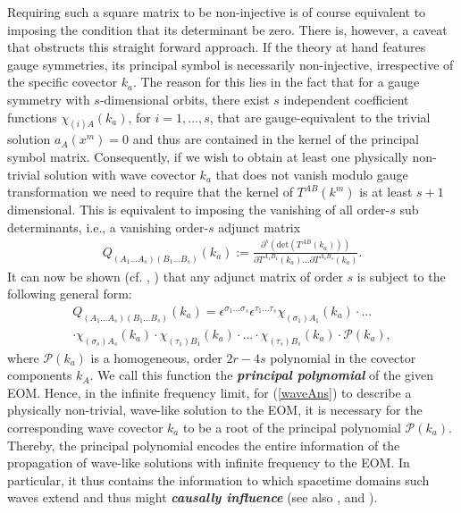 \documentclass[%
 reprint,
nofootinbib,
 amsmath,amssymb,
 aps,
 prd,
floatfix,
]{revtex4-2}
\begin{document}
Requiring such a square matrix to be non-injective is of course equivalent to imposing the condition that its determinant be zero. There is, however, a caveat that obstructs this straight forward approach. If the theory at hand features gauge symmetries, its principal symbol is necessarily non-injective, irrespective of the specific covector $k_a$. 
The reason for this lies in the fact that for a gauge symmetry with $s$-dimensional orbits, there exist $s$ independent coefficient functions $\chi_{(i)A}(k_a)$, for $i = 1,...,s$, that are gauge-equivalent to the trivial solution $a_A(x^m)=0$ and thus are contained in the kernel of the principal symbol matrix. 
Consequently, if we wish to obtain at least one physically non-trivial solution with wave covector $k_a$ that does not vanish modulo gauge transformation we need to require that the kernel of $T^{AB}(k^m)$ is at least $s+1$ dimensional. This is equivalent to imposing the vanishing of all order-$s$ sub determinants, i.e., a vanishing order-$s$ adjunct matrix
\begin{align}
    Q_{(A_1...A_s) (B_1...B_s)}(k_a) := \frac{\partial^s (\mathrm{det}(T^{AB}(k_a)))}{\partial T^{A_1 B_1}(k_a) ... \partial T^{A_s B_s}(k_a)}.
\end{align}  
It can now be shown (cf. \cite{2018PhRvD..97h4036D}, \cite{2009JPhA...42U5402I}) that any adjunct matrix of order $s$ is subject to the following general form:
\begin{multline}
    Q_{(A_1...A_s) (B_1...B_s)}(k_a) = \epsilon^{\sigma_1...\sigma_s} \epsilon^{\tau_1...\tau_s} \chi_{(\sigma_1)A_1}(k_a) \cdot ... \\
    \cdot \chi_{(\sigma_s)A_s}(k_a) \cdot \chi_{(\tau_1)B_1}(k_a) \cdot ... \cdot \chi_{(\tau_s)B_s}(k_a) \cdot \mathcal{P}(k_a),
\end{multline}
where $\mathcal{P}(k_a)$ is a homogeneous, order $2r-4s$ polynomial in the covector components $k_A$. We call this function the \textit{\textbf{principal polynomial}} of the given EOM.
Hence, in the infinite frequency limit, for (\ref{waveAns}) to describe a physically non-trivial, wave-like solution to the EOM, it is necessary for the corresponding wave covector $k_a$ to be a root of the principal polynomial $\mathcal{P}(k_a)$. 
Thereby, the principal polynomial encodes the entire information of the propagation of wave-like solutions with infinite frequency to the EOM. In particular, it thus contains the information to which spacetime domains such waves extend and thus might \textit{\textbf{causally influence}} (see also \cite{2012arXiv1211.1914K}, \cite{seiler2009involution} and \cite{2011PhRvD..83d4047R}).
\end{document}
